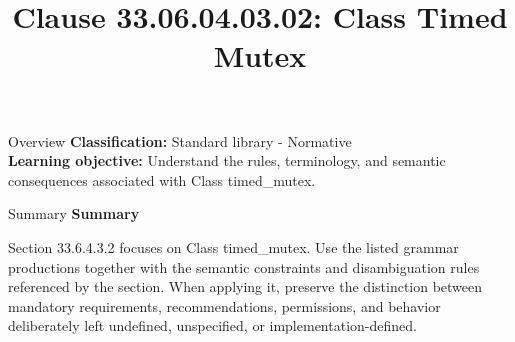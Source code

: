 \documentclass[10pt,letterpaper]{article}
\title{Clause 33.06.04.03.02: Class Timed Mutex}
\author{}
\date{}
\begin{document}
\maketitle
\begin{CornellOverviewBox}{Overview}
\textbf{Classification:} Standard library - Normative\\[2pt]
\textbf{Learning objective:} Understand the rules, terminology, and semantic consequences associated with Class timed\_mutex.
\end{CornellOverviewBox}\begin{CornellSummaryBox}{Summary}
{\sffamily\bfseries\color{Accent} Summary}\par\vspace{3pt}Section 33.6.4.3.2 focuses on Class timed\_mutex. Use the listed grammar productions together with the semantic constraints and disambiguation rules referenced by the section. When applying it, preserve the distinction between mandatory requirements, recommendations, permissions, and behavior deliberately left undefined, unspecified, or implementation-defined.
\end{CornellSummaryBox}
\end{document}
